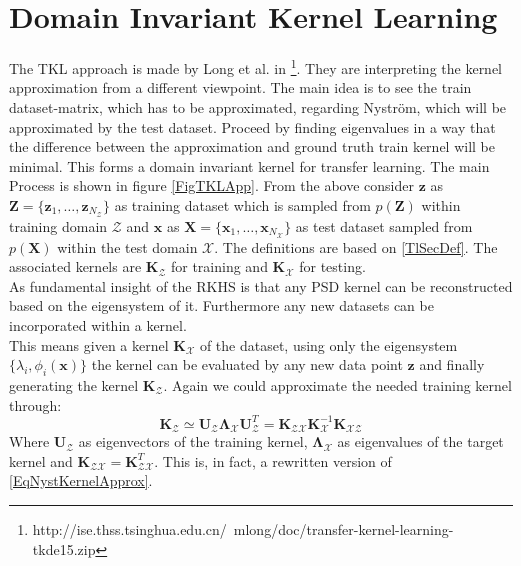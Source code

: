 \section{Domain Invariant Kernel Learning}\label{InSecTrans}
The \ac{TKL} approach is made by Long et al. in  \cite{Long.2015}\footnote{http://ise.thss.tsinghua.edu.cn/~mlong/doc/transfer-kernel-learning-tkde15.zip}.
They are interpreting the kernel approximation from a different viewpoint.
The main idea is to see the train dataset-matrix, which has to be approximated, regarding Nyström, which will be approximated by the test dataset. Proceed by finding eigenvalues in a way that the difference between the approximation and ground truth train kernel will be minimal. This forms a domain invariant kernel for transfer learning.\cite{Long.2015}
The main Process is shown in figure \ref{FigTKLApp}.\newline 
From the above consider $\mathbf{z}$ as $\mathbf{Z}=\{\mathbf{z}_1,\dots,\mathbf{z}_{N_\mathcal{Z}}\}$ as training dataset which is sampled from $p(\mathbf{Z})$ within training domain $\mathcal{Z}$ and $\mathbf{x}$ as $\mathbf{X}=\{\mathbf{x}_1,\dots,\mathbf{x}_{N_\mathcal{X}}\}$ as test dataset sampled from $p(\mathbf{X})$ within the test domain $\mathcal{X}$.
The definitions are based on \ref{TlSecDef}.
The associated kernels are $\mathbf{K}_\mathcal{Z}$ for training and $\mathbf{K}_\mathcal{X}$ for testing.\\
As fundamental insight of the \acs{RKHS} is that any \ac{PSD} kernel can be reconstructed based on the eigensystem of it. Furthermore any new datasets can be incorporated within a kernel.\cite{Long.2015}\\
This means given a kernel $\mathbf{K}_\mathcal{X}$ of the dataset, using only the eigensystem $\{\lambda_i,\phi_i(\mathbf{x})\}$ the kernel can be evaluated by any new data point $\mathbf{z}$ and finally generating the kernel $\mathbf{K}_\mathcal{Z}$.
Again we could approximate the needed training kernel through:\cite{Long.2015}
\begin{equation}\label{EqTrainTestApprox}
	\mathbf{K}_\mathcal{Z} \simeq \mathbf{U}_\mathcal{Z}\boldsymbol{\Lambda}_\mathcal{X} \mathbf{U}_\mathcal{Z}^T = \mathbf{K}_\mathcal{ZX}\mathbf{K}_\mathcal{X}^{-1}\mathbf{K}_\mathcal{XZ}
\end{equation}
Where $\mathbf{U}_\mathcal{Z}$ as eigenvectors of the training kernel, $\boldsymbol{\Lambda}_\mathcal{X}$ as eigenvalues of the target kernel and $\mathbf{K}_\mathcal{ZX} = \mathbf{K}_\mathcal{ZX}^T$.
This is, in fact, a rewritten version of \eqref{EqNystKernelApprox}.\\

